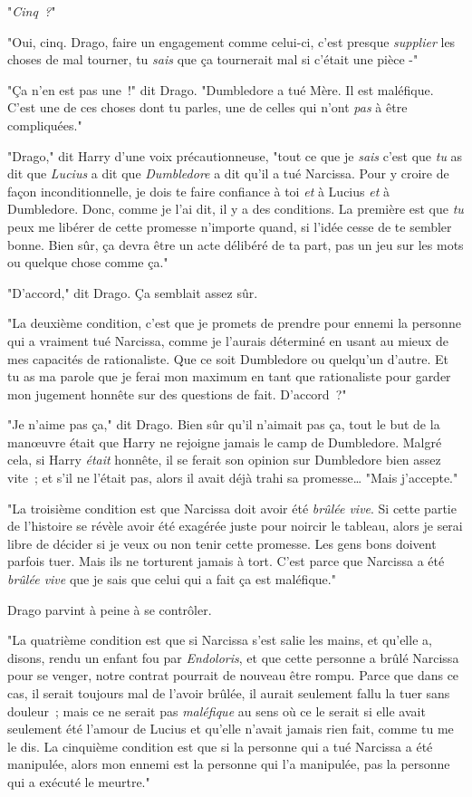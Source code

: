 "\emph{Cinq~?}"

"Oui, cinq. Drago, faire un engagement comme celui-ci, c'est presque \emph{supplier} les choses de mal tourner, tu \emph{sais} que ça tournerait mal si c'était une pièce -"

"Ça n'en est pas une~!" dit Drago. "Dumbledore a tué Mère. Il est maléfique. C'est une de ces choses dont tu parles, une de celles qui n'ont \emph{pas} à être compliquées."

"Drago," dit Harry d'une voix précautionneuse, "tout ce que je \emph{sais} c'est que \emph{tu} as dit que \emph{Lucius} a dit que \emph{Dumbledore} a dit qu'il a tué Narcissa. Pour y croire de façon inconditionnelle, je dois te faire confiance à toi \emph{et} à Lucius \emph{et} à Dumbledore. Donc, comme je l'ai dit, il y a des conditions. La première est que \emph{tu} peux me libérer de cette promesse n'importe quand, si l'idée cesse de te sembler bonne. Bien sûr, ça devra être un acte délibéré de ta part, pas un jeu sur les mots ou quelque chose comme ça."

"D'accord," dit Drago. Ça semblait assez sûr.

"La deuxième condition, c'est que je promets de prendre pour ennemi la personne qui a vraiment tué Narcissa, comme je l'aurais déterminé en usant au mieux de mes capacités de rationaliste. Que ce soit Dumbledore ou quelqu'un d'autre. Et tu as ma parole que je ferai mon maximum en tant que rationaliste pour garder mon jugement honnête sur des questions de fait. D'accord~?"

"Je n'aime pas ça," dit Drago. Bien sûr qu'il n'aimait pas ça, tout le but de la manœuvre était que Harry ne rejoigne jamais le camp de Dumbledore. Malgré cela, si Harry \emph{était} honnête, il se ferait son opinion sur Dumbledore bien assez vite~; et s'il ne l'était pas, alors il avait déjà trahi sa promesse… "Mais j'accepte."

"La troisième condition est que Narcissa doit avoir été \emph{brûlée vive}. Si cette partie de l'histoire se révèle avoir été exagérée juste pour noircir le tableau, alors je serai libre de décider si je veux ou non tenir cette promesse. Les gens bons doivent parfois tuer. Mais ils ne torturent jamais à tort. C'est parce que Narcissa a été \emph{brûlée vive} que je sais que celui qui a fait ça est maléfique."

Drago parvint à peine à se contrôler.

"La quatrième condition est que si Narcissa s'est salie les mains, et qu'elle a, disons, rendu un enfant fou par \emph{Endoloris}, et que cette personne a brûlé Narcissa pour se venger, notre contrat pourrait de nouveau être rompu. Parce que dans ce cas, il serait toujours mal de l'avoir brûlée, il aurait seulement fallu la tuer sans douleur~; mais ce ne serait pas \emph{maléfique} au sens où ce le serait si elle avait seulement été l'amour de Lucius et qu'elle n'avait jamais rien fait, comme tu me le dis. La cinquième condition est que si la personne qui a tué Narcissa a été manipulée, alors mon ennemi est la personne qui l'a manipulée, pas la personne qui a exécuté le meurtre."

